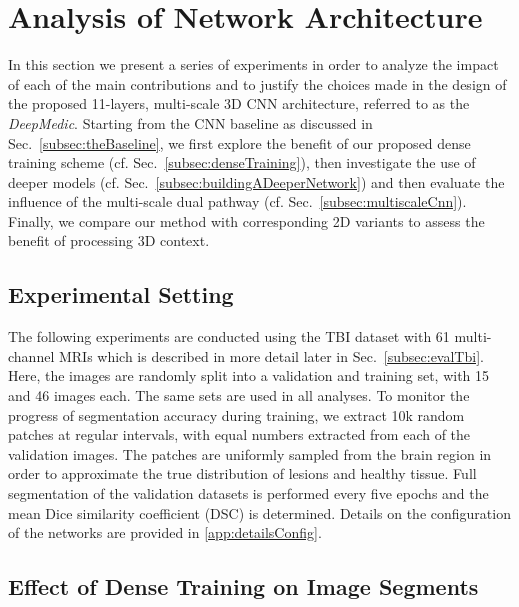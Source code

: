 


\section{Analysis of Network Architecture}
\label{sec:vaOfNetArch}

In this section we present a series of experiments in order to analyze the impact of each of the main contributions and to justify the choices made in the design of the proposed 11-layers, multi-scale 3D CNN architecture, referred to as the \textit{DeepMedic}. Starting from the CNN baseline as discussed in Sec.~\ref{subsec:theBaseline}, we first explore the benefit of our proposed dense training scheme (cf. Sec.~\ref{subsec:denseTraining}), then investigate the use of deeper models (cf. Sec.~\ref{subsec:buildingADeeperNetwork}) and then evaluate the influence of the multi-scale dual pathway (cf. Sec.~\ref{subsec:multiscaleCnn}). Finally, we compare our method with corresponding 2D variants to assess the benefit of processing 3D context.

\subsection{Experimental Setting}
\label{subsec:experimentSetting}

The following experiments are conducted using the TBI dataset with 61 multi-channel MRIs which is described in more detail later in Sec.~\ref{subsec:evalTbi}. Here, the images are randomly split into a validation and training set, with 15 and 46 images each. The same sets are used in all analyses. To monitor the progress of segmentation accuracy during training, we extract 10k random patches at regular intervals, with equal numbers extracted from each of the validation images. The patches are uniformly sampled from the brain region in order to approximate the true distribution of lesions and healthy tissue. Full segmentation of the validation datasets is performed every five epochs and the mean Dice similarity coefficient (DSC) is determined. Details on the configuration of the networks are provided in \ref{app:detailsConfig}.

\subsection{Effect of Dense Training on Image Segments}
\label{subsec:valDenseTraining}

